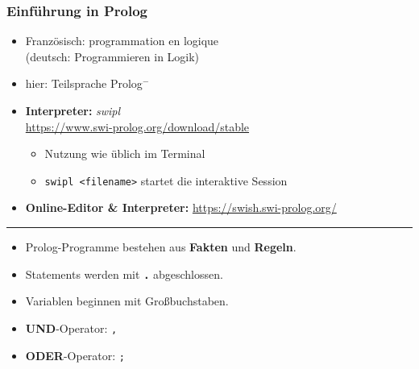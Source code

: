 \documentclass{beamer}
\renewcommand{\emph}[1]{\textbf{#1}}
\begin{document}
\begin{frame} \frametitle{Einführung in Prolog}
	\footnotesize
	\begin{itemize}
		\item Französisch: programmation en logique \\
		(deutsch: Programmieren in Logik)
		\item hier: Teilsprache Prolog${}^-$
		\item \textbf{Interpreter:} \textit{swipl} \\ \url{https://www.swi-prolog.org/download/stable}
		\begin{itemize}
			\item Nutzung wie üblich im Terminal
			\item \texttt{swipl <filename>} startet die interaktive Session
		\end{itemize}
		\item \textbf{Online-Editor \& Interpreter:} \url{https://swish.swi-prolog.org/}
	\end{itemize}

	\medskip \pause \hrule

	\begin{itemize}		
		\item Prolog-Programme bestehen aus \emph{Fakten} und \emph{Regeln}.
		\bigskip
		\item Statements werden mit \emph{\texttt{.}} abgeschlossen.
		\item Variablen beginnen mit Großbuchstaben.
		\bigskip
		\item \emph{UND}-Operator: \hspace{.25cm} \texttt{,}
		\item \emph{ODER}-Operator:\hspace{.2cm} \texttt{;}
	\end{itemize}
\end{frame}
\end{document}
